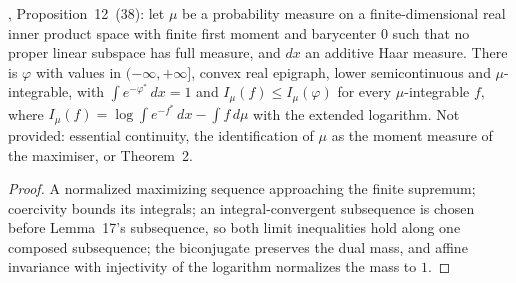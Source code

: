 \begin{theorem}
  \label{thm:cek-variational-maximum}
  \leanok
  \cite{CorderoKlartag2015}, Proposition~12~(38): let $\mu$ be a probability measure on a finite-dimensional real inner product
  space with finite first moment and barycenter $0$ such that no proper linear subspace has full measure, and $dx$ an additive
  Haar measure.  There is $\varphi$ with values in $(-\infty,+\infty]$, convex real epigraph, lower semicontinuous and
  $\mu$-integrable, with $\int e^{-\varphi^*}\,dx=1$ and $I_\mu(f)\le I_\mu(\varphi)$ for every $\mu$-integrable $f$, where
  $I_\mu(f)=\log\int e^{-f^*}\,dx-\int f\,d\mu$ with the extended logarithm.  Not provided: essential continuity, the
  identification of $\mu$ as the moment measure of the maximiser, or Theorem~2.
\end{theorem}
\begin{proof}
  \leanok
  A normalized maximizing sequence approaching the finite supremum; coercivity bounds its integrals; an integral-convergent
  subsequence is chosen before Lemma~17's subsequence, so both limit inequalities hold along one composed subsequence; the
  biconjugate preserves the dual mass, and affine invariance with injectivity of the logarithm normalizes the mass to $1$.
\end{proof}

